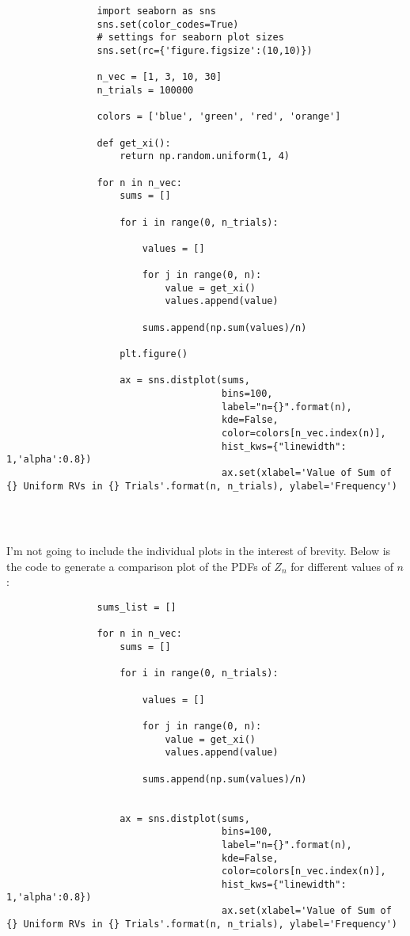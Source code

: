 \documentclass[]{article}
\begin{document}
\begin{enumerate}
\begin{enumerate}
\begin{lstlisting}
				import seaborn as sns
				sns.set(color_codes=True)
				# settings for seaborn plot sizes
				sns.set(rc={'figure.figsize':(10,10)})
				
				n_vec = [1, 3, 10, 30]
				n_trials = 100000
				
				colors = ['blue', 'green', 'red', 'orange']
				
				def get_xi():
					return np.random.uniform(1, 4)
				
				for n in n_vec:
					sums = []
				
					for i in range(0, n_trials):
				
						values = []
				
						for j in range(0, n):
							value = get_xi()
							values.append(value)
				
						sums.append(np.sum(values)/n)
				
					plt.figure()
				
					ax = sns.distplot(sums,
									  bins=100,
									  label="n={}".format(n),
									  kde=False,
									  color=colors[n_vec.index(n)],
									  hist_kws={"linewidth": 1,'alpha':0.8})
									  ax.set(xlabel='Value of Sum of {} Uniform RVs in {} Trials'.format(n, n_trials), ylabel='Frequency')
				
				
				
			\end{lstlisting}
			
			I'm not going to include the individual plots in the interest of brevity. Below is the code to generate a comparison plot of the PDFs of $Z_n$ for different values of $ n $:\\
			
			\begin{lstlisting}
				sums_list = []
				
				for n in n_vec:
					sums = []
				
					for i in range(0, n_trials):
				
						values = []
				
						for j in range(0, n):
							value = get_xi()
							values.append(value)
				
						sums.append(np.sum(values)/n)
				
				
					ax = sns.distplot(sums,
									  bins=100,
									  label="n={}".format(n),
								   	  kde=False,
									  color=colors[n_vec.index(n)],
									  hist_kws={"linewidth": 1,'alpha':0.8})
									  ax.set(xlabel='Value of Sum of {} Uniform RVs in {} Trials'.format(n, n_trials), ylabel='Frequency')
			\end{lstlisting}
			

\end{enumerate}
\end{enumerate}
\end{document}
